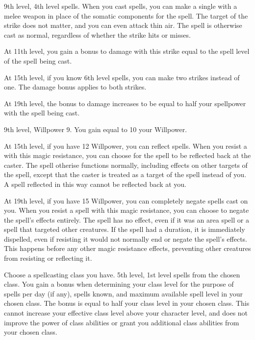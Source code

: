     \featpres 9th level, 4th level spells.
    \featben When you cast spells, you can make a single  with a melee weapon in place of the somatic components for the spell.
    The target of the strike does not matter, and you can even attack thin air.
    The spell is otherwise cast as normal, regardless of whether the strike hits or misses.

    At 11th level, you gain a bonus to damage with this strike equal to the spell level of the spell being cast.

    At 15th level, if you know 6th level spells, you can make two strikes instead of one.
    The damage bonus applies to both strikes.

    At 19th level, the bonus to damage increases to be equal to half your spellpower with the spell being cast.

    \featpres 9th level, Willpower 9.
    \featben You gain  equal to 10 \add your Willpower.

    At 15th level, if you have 12 Willpower, you can reflect spells.
    When you resist a  with this magic resistance, you can choose for the spell to be reflected back at the caster.
    The spell otherise functions normally, including effects on other targets of the spell, except that the caster is treated as a target of the spell instead of you.
    A spell reflected in this way cannot be reflected back at you.

    At 19th level, if you have 15 Willpower, you can completely negate spells cast on you.
    When you resist a spell with this magic resistance, you can choose to negate the spell's effects entirely.
    The spell has no effect, even if it was an area spell or a spell that targeted other creatures.
    If the spell had a duration, it is immediately dispelled, even if resisting it would not normally end or negate the spell's effects.
    This happens before any other magic resistance effects, preventing other creatures from resisting or reflecting it.

    Choose a spellcasting class you have.
    \featpres 5th level, 1st level spells from the chosen class.
    \featben You gain a bonus when determining your class level for the purpose of spells per day (if any), spells known, and maximum available spell level in your chosen class.
    The bonus is equal to half your class level in your chosen class.
    This cannot increase your effective class level above your character level, and does not improve the power of class abilities or grant you additional class abilities from your chosen class.

